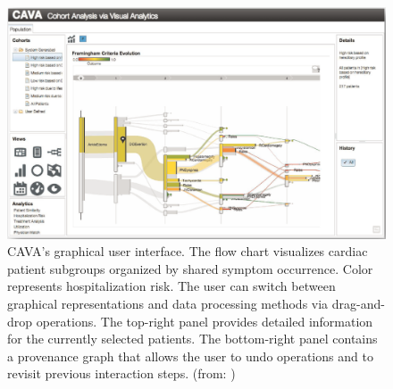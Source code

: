 \documentclass[
  oneside]{book}
\begin{document}
\begin{figure}

{\centering \includegraphics[width=0.8\linewidth]{figures/03-cava} 

}

\caption{CAVA's graphical user interface. The flow chart visualizes cardiac patient subgroups organized by shared symptom occurrence. Color represents hospitalization risk. The user can switch between graphical representations and data processing methods via drag-and-drop operations. The top-right panel provides detailed information for the currently selected patients. The bottom-right panel contains a provenance graph that allows the user to undo operations and to revisit previous interaction steps. (from: \autocite{Zhang:CAVA2015})}\label{fig:03-cava}
\end{figure}
\end{document}
